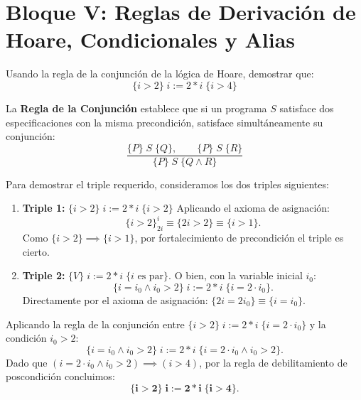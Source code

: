 \section{Bloque V: Reglas de Derivación de Hoare, Condicionales y Alias}

\begin{ejercicio}
Usando la regla de la conjunción de la lógica de Hoare, demostrar que:
\[
\{i > 2\} \; i := 2 * i \; \{i > 4\}
\]
\end{ejercicio}

\begin{solucion}
La \textbf{Regla de la Conjunción} establece que si un programa $S$ satisface dos especificaciones con la misma precondición, satisface simultáneamente su conjunción:
\[
\frac{\{P\} \; S \; \{Q\}, \qquad \{P\} \; S \; \{R\}}{\{P\} \; S \; \{Q \land R\}}
\]

Para demostrar el triple requerido, consideramos los dos triples siguientes:
\begin{enumerate}
    \item \textbf{Triple 1:} $\{i > 2\} \; i := 2 * i \; \{i > 2\}$
    Aplicando el axioma de asignación:
    \[
    \{i > 2\}_{2i}^i \equiv \{2i > 2\} \equiv \{i > 1\}.
    \]
    Como $\{i > 2\} \implies \{i > 1\}$, por fortalecimiento de precondición el triple es cierto.
    
    \item \textbf{Triple 2:} $\{V\} \; i := 2 * i \; \{i \text{ es par}\}$. O bien, con la variable inicial $i_0$:
    \[
    \{i = i_0 \land i_0 > 2\} \; i := 2 * i \; \{i = 2 \cdot i_0\}.
    \]
    Directamente por el axioma de asignación: $\{2i = 2i_0\} \equiv \{i = i_0\}$.
\end{enumerate}

Aplicando la regla de la conjunción entre $\{i > 2\} \; i := 2 * i \; \{i = 2 \cdot i_0\}$ y la condición $i_0 > 2$:
\[
\{i = i_0 \land i_0 > 2\} \; i := 2 * i \; \{i = 2 \cdot i_0 \land i_0 > 2\}.
\]
Dado que $(i = 2 \cdot i_0 \land i_0 > 2) \implies (i > 4)$, por la regla de debilitamiento de poscondición concluimos:
\[
\mathbf{\{i > 2\} \; i := 2 * i \; \{i > 4\}}.
\]
\end{solucion}

